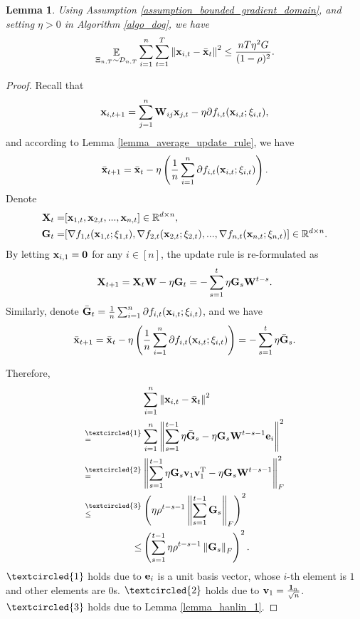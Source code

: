 \documentclass{article}
\newtheorem{Lemma}{\bf{Lemma}}
\begin{document}
\begin{Lemma}
\label{lemma_x_variance_norm_square}
Using Assumption \ref{assumption_bounded_gradient_domain}, and setting $\eta>0$ in Algorithm \ref{algo_dog}, we have 
\begin{align}
\nonumber
\mathop{\mathbb{E}}_{ \Xi_{n,T} \sim \mathcal{D}_{n,T} } \sum_{i=1}^n\sum_{t=1}^T \left\lVert{\bf x}_{i,t} - \bar{{\bf x}}_t\right\rVert^2 \le \frac{nT\eta^2 G }{(1-\rho)^2}.
\end{align}

\end{Lemma}
\begin{proof}


Recall that 
\begin{align}
\nonumber
{\bf x}_{i,t+1} = \sum_{j=1}^n {\bf W}_{ij}{\bf x}_{j,t} - \eta \partial f_{i,t}({\bf x}_{i,t};\xi_{i,t}), 
\end{align} and according to Lemma \ref{lemma_average_update_rule}, we have 
\begin{align}
\nonumber
\bar{{\bf x}}_{t+1} = \bar{{\bf x}}_t - \eta \left( \frac{1}{n}\sum_{i=1}^n \partial f_{i,t}({\bf x}_{i,t};\xi_{i,t}) \right).
\end{align} Denote 
\begin{align}
\nonumber
{\bf X}_t = &  [{\bf x}_{1,t}, {\bf x}_{2,t}, ..., {\bf x}_{n,t}] \in \mathbb{R}^{d\times n}, \\ \nonumber
{\bf G}_t = & [\nabla f_{1,t}({\bf x}_{1,t};\xi_{1,t}), \nabla f_{2,t}({\bf x}_{2,t};\xi_{2,t}), ..., \nabla f_{n,t}({\bf x}_{n,t};\xi_{n,t})] \in \mathbb{R}^{d\times n}.
\end{align} By letting ${\bf x}_{i,1} = {\bf 0}$ for any $i\in[n]$, the update rule is re-formulated as 
\begin{align}
\nonumber
{\bf X}_{t+1} = {\bf X}_t {\bf W} - \eta {\bf G}_t = - \sum_{s=1}^t \eta {\bf G}_s {\bf W}^{t-s}. 
\end{align} Similarly, denote $\bar{{\bf G}}_t = \frac{1}{n}\sum_{i=1}^n \partial f_{i,t}({\bf x}_{i,t};\xi_{i,t})$, and we have
\begin{align}
\bar{{\bf x}}_{t+1} = \bar{{\bf x}}_t - \eta \left( \frac{1}{n}\sum_{i=1}^n \partial f_{i,t}({\bf x}_{i,t};\xi_{i,t}) \right) = - \sum_{s=1}^t \eta \bar{{\bf G}}_s. 
\end{align}


Therefore, 
\begin{align}
\nonumber
& \sum_{i=1}^n \lrnorm{\x_{i,t} - \bar{\x}_t}^2 \\ \nonumber
\refabovecir{=}{\textcircled{1}} & \sum_{i=1}^n \lrnorm{ \sum_{s=1}^{t-1} \eta \bar{\G}_s - \eta \G_s \W^{t-s-1}\e_i }^2   \\ \nonumber
\refabovecir{=}{\textcircled{2}} & \lrnorm{ \sum_{s=1}^{t-1} \eta \G_s\v_1 \v_1\Tr - \eta \G_s \W^{t-s-1} }^2_F   \\ \nonumber
\refabovecir{\le}{\textcircled{3}} & \lrincir{ \eta \rho^{t-s-1} \lrnorm{\sum_{s=1}^{t-1}\G_s}_F}^2 \\ \nonumber
\le & \lrincir{ \sum_{s=1}^{t-1} \eta \rho^{t-s-1} \lrnorm{\G_s}_F}^2.
\end{align} $\textcircled{1}$ holds due to ${\bf e}_i$ is a unit basis vector, whose $i$-th element is $1$ and other elements are $0$s. $\textcircled{2}$ holds due to ${\bf v}_1 = \frac{{\bf 1}_n}{\sqrt{n}}$. $\textcircled{3}$ holds due to Lemma \ref{lemma_hanlin_1}. 



\end{proof}
\end{document}
